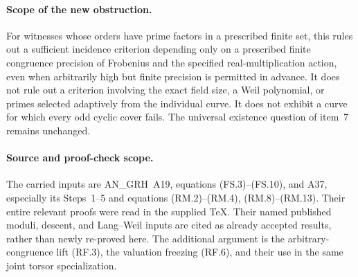 \paragraph{Scope of the new obstruction.}
For witnesses whose orders have prime factors in a prescribed
finite set, this rules out a sufficient incidence criterion
depending only on a prescribed finite congruence precision of
Frobenius and the specified real-multiplication action, even
when arbitrarily high but finite precision is permitted in
advance.  It does
not rule out a criterion involving the exact field size, a
Weil polynomial, or primes selected adaptively from the
individual curve.  It does not exhibit a curve for which every
odd cyclic cover fails.  The universal existence question of
item~7 remains unchanged.

\paragraph{Source and proof-check scope.}
The carried inputs are AN\_GRH~A19, equations (FS.3)--(FS.10),
and A37, especially its Steps~1--5 and equations
(RM.2)--(RM.4), (RM.8)--(RM.13).  Their entire relevant
proofs were read in the supplied TeX.  Their named published
moduli, descent, and Lang--Weil inputs are cited as already
accepted results, rather than newly re-proved here.  The
additional argument is the arbitrary-congruence lift (RF.3),
the valuation freezing (RF.6), and their use in the same joint
torsor specialization.
